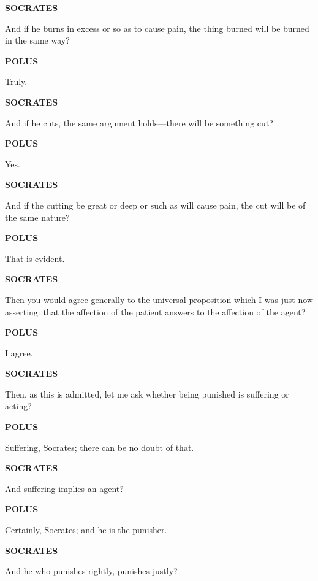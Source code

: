 \documentclass[11pt,letter]{article}
\begin{document}
\par \textbf{SOCRATES}
\par   And if he burns in excess or so as to cause pain, the thing burned will be burned in the same way?

\par \textbf{POLUS}
\par   Truly.

\par \textbf{SOCRATES}
\par   And if he cuts, the same argument holds—there will be something cut?

\par \textbf{POLUS}
\par   Yes.

\par \textbf{SOCRATES}
\par   And if the cutting be great or deep or such as will cause pain, the cut will be of the same nature?

\par \textbf{POLUS}
\par   That is evident.

\par \textbf{SOCRATES}
\par   Then you would agree generally to the universal proposition which I was just now asserting:  that the affection of the patient answers to the affection of the agent?

\par \textbf{POLUS}
\par   I agree.

\par \textbf{SOCRATES}
\par   Then, as this is admitted, let me ask whether being punished is suffering or acting?

\par \textbf{POLUS}
\par   Suffering, Socrates; there can be no doubt of that.

\par \textbf{SOCRATES}
\par   And suffering implies an agent?

\par \textbf{POLUS}
\par   Certainly, Socrates; and he is the punisher.

\par \textbf{SOCRATES}
\par   And he who punishes rightly, punishes justly?
\end{document}

